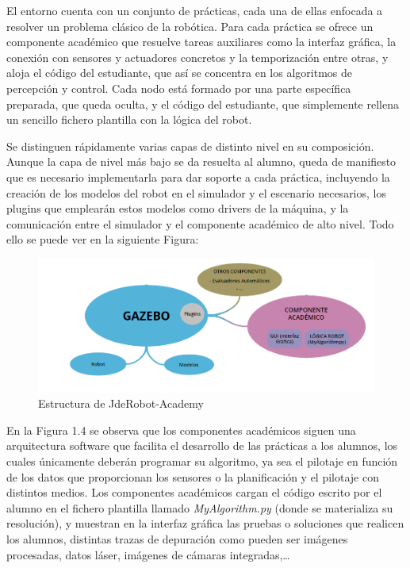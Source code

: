 El entorno cuenta con un conjunto de prácticas, cada una de ellas enfocada a resolver un problema clásico de la robótica. Para cada práctica se ofrece un componente académico que resuelve tareas auxiliares como la interfaz gráfica, la conexión con sensores y actuadores concretos y la temporización entre otras, y  aloja el código del estudiante, que así se concentra en los algoritmos de percepción y control. Cada nodo está formado por una parte específica preparada, que queda oculta, y el código del estudiante, que simplemente rellena un sencillo fichero plantilla con la lógica del robot.

Se distinguen rápidamente varias capas de distinto nivel en su composición. Aunque la capa de nivel más bajo se da resuelta al alumno, queda de manifiesto que es necesario implementarla para dar soporte a cada práctica, incluyendo  la creación de los modelos del robot en el simulador y el escenario necesarios, los plugins que emplearán estos modelos como drivers de la máquina, y la comunicación entre el simulador y el componente académico de alto nivel. Todo ello se puede ver en la siguiente Figura: 

\begin{figure}[H]
  \begin{center}
    \includegraphics[width=0.9\linewidth]{figures/estructura_jde.png}
		\caption{Estructura de JdeRobot-Academy}
		\label{fig.estructura}
		\end{center}
\end{figure}

En la Figura 1.4 se observa que los componentes académicos siguen una arquitectura software que facilita el desarrollo de las prácticas a los alumnos, los cuales únicamente deberán programar su algoritmo, ya sea el pilotaje en función de los datos que proporcionan los sensores o la planificación y el pilotaje con distintos medios. Los componentes académicos cargan el código escrito por el alumno en el fichero plantilla llamado \textit{MyAlgorithm.py} (donde se materializa su resolución), y muestran en la interfaz  gráfica las pruebas o soluciones que realicen los alumnos, distintas trazas de depuración como pueden ser imágenes procesadas, datos láser, imágenes de cámaras integradas,…


